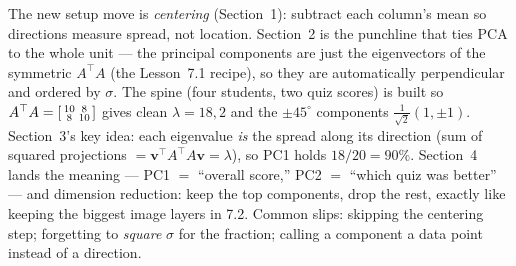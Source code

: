 \documentclass[10pt]{article}
\newcommand{\vv}{\mathbf{v}}
\newcommand{\T}{^{\top}}
\begin{document}
\begin{teachernote}
The new setup move is \emph{centering} (Section~1): subtract each column's mean so directions measure spread,
not location. Section~2 is the punchline that ties PCA to the whole unit --- the principal components are just
the eigenvectors of the symmetric $A\T A$ (the Lesson~7.1 recipe), so they are automatically perpendicular
and ordered by $\sigma$. The spine (four students, two quiz scores) is built so $A\T A=\begin{bsmallmatrix} 10 & 8\\ 8 & 10 \end{bsmallmatrix}$
gives clean $\lambda=18,2$ and the $\pm45^\circ$ components $\tfrac1{\sqrt2}(1,\pm1)$. Section~3's key idea:
each eigenvalue \emph{is} the spread along its direction (sum of squared projections $=\vv\T A\T A\vv=\lambda$),
so PC1 holds $18/20=90\%$. Section~4 lands the meaning --- PC1 $=$ ``overall score,'' PC2 $=$ ``which quiz was
better'' --- and dimension reduction: keep the top components, drop the rest, exactly like keeping the biggest
image layers in 7.2. Common slips: skipping the centering step; forgetting to \emph{square} $\sigma$ for the
fraction; calling a component a data point instead of a direction.
\end{teachernote}
\end{document}
